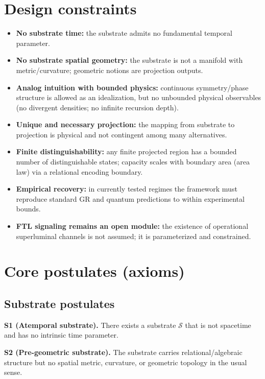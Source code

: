 \documentclass[reprint, amsmath, amssymb, aps, prd]{revtex4-2}
\begin{document}
\section{Design constraints}
\begin{itemize}
    \item \textbf{No substrate time:} the substrate admits no fundamental temporal parameter.
    \item \textbf{No substrate spatial geometry:} the substrate is not a manifold with metric/curvature; geometric notions are projection outputs.
    \item \textbf{Analog intuition with bounded physics:} continuous symmetry/phase structure is allowed as an idealization, but no unbounded physical observables (no divergent densities; no infinite recursion depth).
    \item \textbf{Unique and necessary projection:} the mapping from substrate to projection is physical and not contingent among many alternatives.
    \item \textbf{Finite distinguishability:} any finite projected region has a bounded number of distinguishable states; capacity scales with boundary area (area law) via a relational encoding boundary.
    \item \textbf{Empirical recovery:} in currently tested regimes the framework must reproduce standard GR and quantum predictions to within experimental bounds.
    \item \textbf{FTL signaling remains an open module:} the existence of operational superluminal channels is not assumed; it is parameterized and constrained.
\end{itemize}

\section{Core postulates (axioms)}

\subsection{Substrate postulates}
\textbf{S1 (Atemporal substrate).} There exists a substrate $\mathcal{S}$ that is not spacetime and has no intrinsic time parameter.  

\textbf{S2 (Pre-geometric substrate).} The substrate carries relational/algebraic structure but no spatial metric, curvature, or geometric topology in the usual sense.  
\end{document}
